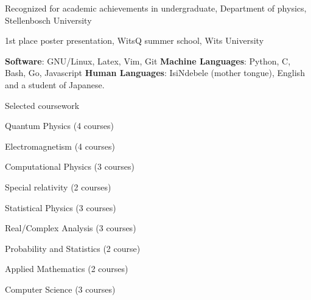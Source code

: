 \documentclass{edelgas-resume}
\begin{document}
    \begin{position}{}{}
        \item Recognized for academic achievements in undergraduate, Department of physics, Stellenbosch University
        \item 1st place poster presentation, WitsQ summer school, Wits
            University
    \end{position}



    \vspace{-1em}
    \textbf{Software}: GNU/Linux, Latex, Vim, Git\newline
    \textbf{Machine Languages}: Python, C, Bash, Go, Javascript\newline
    \textbf{Human Languages}: IsiNdebele (mother tongue), English and a student of Japanese.
    \vspace{1.5em}

    \vspace{-1.0em}
    \begin{position}{Selected coursework}{}
        \item {Quantum Physics (4 courses)}
        \item {Electromagnetism (4 courses)}
        \item {Computational Physics (3 courses)}
        \item {Special relativity (2 courses)}
        \item {Statistical Physics (3 courses)}
        \item {Real/Complex Analysis (3 courses)}
        \item {Probability and Statistics (2 course)}
        \item {Applied Mathematics (2 courses)} 
        \item {Computer Science (3 courses)}
    \end{position}
\end{document}
